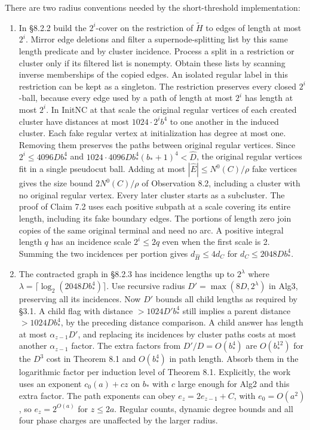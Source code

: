 \documentclass[11pt]{article}
\providecommand{\tightlist}{\setlength{\itemsep}{0pt}\setlength{\parskip}{0pt}}
\begin{document}
There are two radius conventions needed by the short-threshold implementation:

\begin{enumerate}
\def\labelenumi{\arabic{enumi}.}
\tightlist
\item
  In §8.2.2 build the \(2^i\)-cover on the restriction of \(\widetilde H\) to edges of length at most \(2^i\). Mirror edge deletions and filter a supernode-splitting list by this same length predicate and by cluster incidence. Process a split in a restriction or cluster only if its filtered list is nonempty. Obtain these lists by scanning inverse memberships of the copied edges. An isolated regular label in this restriction can be kept as a singleton. The restriction preserves every closed \(2^i\)-ball, because every edge used by a path of length at most \(2^i\) has length at most \(2^i\). In InitNC at that scale the original regular vertices of each created cluster have distances at most \(1024\cdot 2^i b^4\) to one another in the induced cluster. Each fake regular vertex at initialization has degree at most one. Removing them preserves the paths between original regular vertices. Since \(2^i\le 4096D b_*^4\) and \(1024\cdot4096D b_*^4(b_*+1)^4 <\widehat D\), the original regular vertices fit in a single pseudocut ball. Adding at most \(|\widehat E|\le N^0(C)/\rho\) fake vertices gives the size bound \(2N^0(C)/\rho\) of Observation 8.2, including a cluster with no original regular vertex. Every later cluster starts as a subcluster. The proof of Claim 7.2 uses each positive subpath at a scale covering its entire length, including its fake boundary edges. The portions of length zero join copies of the same original terminal and need no arc. A positive integral length \(q\) has an incidence scale \(2^i\le2q\) even when the first scale is 2. Summing the two incidences per portion gives \(d_{\widehat H}\le4d_C\) for \(d_C\le2048D b_*^4\).
\item
  The contracted graph in §8.2.3 has incidence lengths up to \(2^\lambda\) where \(\lambda=\lceil\log_2(2048D b_*^4)\rceil\). Use recursive radius \(D'=\max(8D,2^\lambda)\) in Alg3, preserving all its incidences. Now \(D'\) bounds all child lengths as required by §3.1. A child flag with distance \(>1024D'b_*^4\) still implies a parent distance \(>1024D b_*^4\), by the preceding distance comparison. A child answer has length at most \(\alpha_{z-1}D'\), and replacing its incidences by cluster paths costs at most another \(\alpha_{z-1}\) factor. The extra factors from \(D'/D=O(b_*^4)\) are \(O(b_*^{12})\) for the \(D^3\) cost in Theorem 8.1 and \(O(b_*^4)\) in path length. Absorb them in the logarithmic factor per induction level of Theorem 8.1. Explicitly, the work uses an exponent \(c_0(a)+c z\) on \(b_*\) with \(c\) large enough for Alg2 and this extra factor. The path exponents can obey \(e_z=2e_{z-1}+C\), with \(e_0=O(a^2)\), so \(e_z=2^{O(a)}\) for \(z\le 2a\). Regular counts, dynamic degree bounds and all four phase charges are unaffected by the larger radius.
\end{enumerate}
\end{document}
